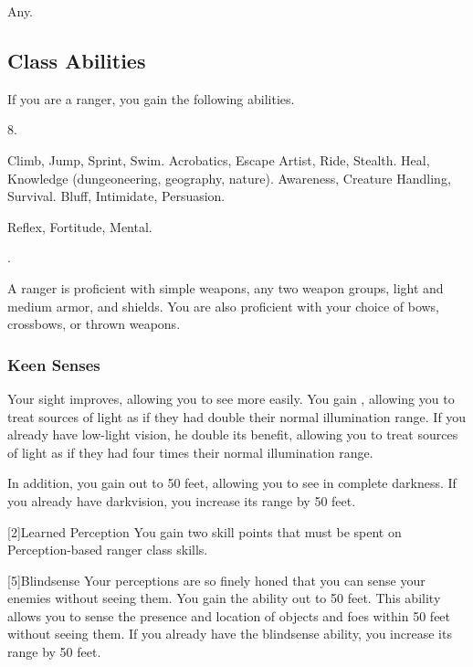      Any.

    \subsection{Class Abilities}
        If you are a ranger, you gain the following abilities.

         8.

         Climb, Jump, Sprint, Swim.
         Acrobatics, Escape Artist, Ride, Stealth.
         Heal, Knowledge (dungeoneering, geography, nature).
         Awareness, Creature Handling, Survival.
         Bluff, Intimidate, Persuasion.

          Reflex,  Fortitude,  Mental.

         .

        A ranger is proficient with simple weapons, any two weapon groups, light and medium armor, and shields.
        You are also proficient with your choice of bows, crossbows, or thrown weapons.

        \subsubsection{Keen Senses}
            Your sight improves, allowing you to see more easily.
            You gain , allowing you to treat sources of light as if they had double their normal illumination range.
            If you already have low-light vision, he double its benefit, allowing you to treat sources of light as if they had four times their normal illumination range.

            In addition, you gain  out to 50 feet, allowing you to see in complete darkness.
            If you already have darkvision, you increase its range by 50 feet.

            [2]{Learned Perception} You gain two skill points that must be spent on Perception-based ranger class skills.

            [5]{Blindsense}
            Your perceptions are so finely honed that you can sense your enemies without seeing them.
            You gain the  ability out to 50 feet.
            This ability allows you to sense the presence and location of objects and foes within 50 feet without seeing them.
            If you already have the blindsense ability, you increase its range by 50 feet.

